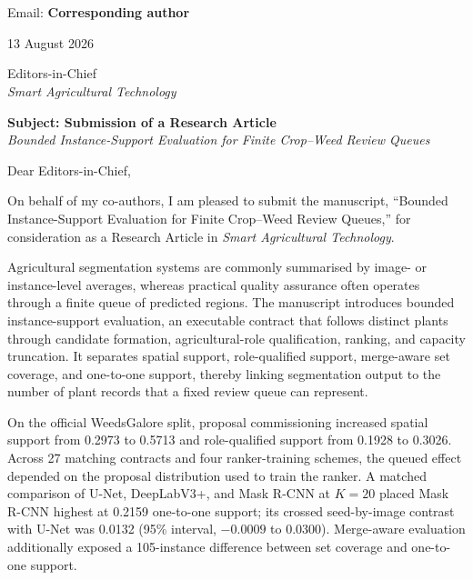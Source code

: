 \documentclass[11pt]{article}
\begin{document}
\ifAuthorMetadataReady
{\large\textbf{\CorrespondingAuthor}}\\[-0.15em]
\CorrespondingAffiliation\\
Email: \href{mailto:\CorrespondingEmail}{\CorrespondingEmail}
\else
{\large\textbf{Corresponding author}}
\fi

\vspace{0.55em}
13 August 2026

\vspace{0.55em}
Editors-in-Chief\\
\emph{Smart Agricultural Technology}

\vspace{0.55em}
\textbf{Subject: Submission of a Research Article}\\[-0.1em]
\emph{Bounded Instance-Support Evaluation for Finite Crop--Weed Review Queues}

\vspace{0.35em}
Dear Editors-in-Chief,

On behalf of my co-authors, I am pleased to submit the manuscript, ``Bounded Instance-Support Evaluation for Finite Crop--Weed Review Queues,'' for consideration as a Research Article in \emph{Smart Agricultural Technology}.

Agricultural segmentation systems are commonly summarised by image- or instance-level averages, whereas practical quality assurance often operates through a finite queue of predicted regions. The manuscript introduces bounded instance-support evaluation, an executable contract that follows distinct plants through candidate formation, agricultural-role qualification, ranking, and capacity truncation. It separates spatial support, role-qualified support, merge-aware set coverage, and one-to-one support, thereby linking segmentation output to the number of plant records that a fixed review queue can represent.

On the official WeedsGalore split, proposal commissioning increased spatial support from 0.2973 to 0.5713 and role-qualified support from 0.1928 to 0.3026. Across 27 matching contracts and four ranker-training schemes, the queued effect depended on the proposal distribution used to train the ranker. A matched comparison of U-Net, DeepLabV3+, and Mask R-CNN at $K=20$ placed Mask R-CNN highest at 0.2159 one-to-one support; its crossed seed-by-image contrast with U-Net was 0.0132 (95\% interval, $-0.0009$ to 0.0300). Merge-aware evaluation additionally exposed a 105-instance difference between set coverage and one-to-one support.
\end{document}
